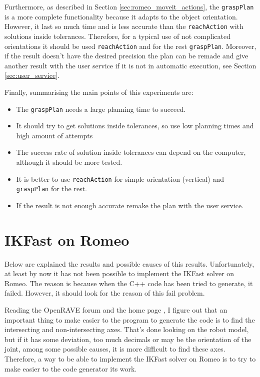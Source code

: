 \documentclass[12pt,a4paper,final,twoside,openright]{report}
\begin{document}
Furthermore, as described in Section \ref{sec:romeo_moveit_actions}, the \texttt{graspPlan} is a more complete functionality because it adapts to the object orientation. However, it last so much time and is less accurate than the \texttt{reachAction} with solutions inside tolerances. Therefore, for a typical use of not complicated orientations it should be used \texttt{reachAction} and for the rest \texttt{graspPlan}. Moreover, if the result doesn't have the desired precision the plan can be remade and give another result with the user service if it is not in automatic execution, see Section \ref{sec:user_service}.

Finally, summarising the main points of this experiments are:

\begin{itemize}
\item The \texttt{graspPlan} needs a large planning time to succeed.
\item It should try to get solutions inside tolerances, so use low planning times and high amount of attempts
\item The success rate of solution inside tolerances can depend on the computer, although it should be more tested.
\item It is better to use \texttt{reachAction} for simple orientation (vertical) and \texttt{graspPlan} for the rest.
\item If the result is not enough accurate remake the plan with the user service.
\end{itemize}

\vspace{-10pt}
\section{IKFast on Romeo}

Below are explained the results and possible causes of this results. Unfortunately, at least by now it has not been possible to implement the IKFast solver on Romeo. The reason is because when the C++ code has been tried to generate, it failed. However, it should look for the reason of this fail problem.

Reading the OpenRAVE forum \cite{Diankova} and the home page \cite{Diankov}, I figure out that an important thing to make easier to the program to generate the code is to find the intersecting and non-intersecting axes. That's done looking on the robot model, but if it has some deviation, too much decimals or may be the orientation of the joint, among some possible causes, it is more difficult to find these axes. Therefore, a way to be able to implement the IKFast solver on Romeo is to try to make easier to the code generator its work.
\end{document}
